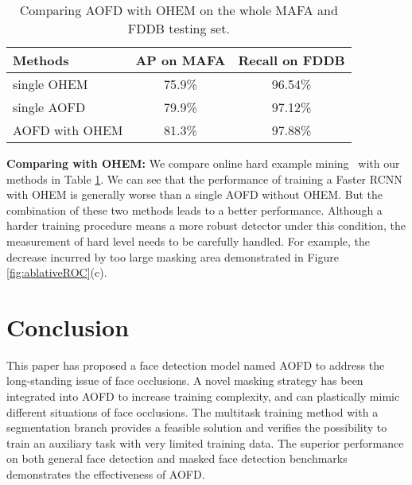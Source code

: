 \documentclass[10pt,twocolumn,letterpaper]{article}
\begin{document}
\begin{table}
	\renewcommand{\arraystretch}{1.5}
       \begin{center}
	\begin{tabular}{|l|c|c|}
		\hline
		Methods & \multicolumn{1}{l|}{AP on MAFA} & Recall on FDDB\\
		\hline\hline
		single OHEM & 75.9\% & 96.54\%\\
		single AOFD & 79.9\% & 97.12\%\\
		AOFD with OHEM & 81.3\% &97.88\%\\
		\hline
	\end{tabular}\end{center}
	\caption{Comparing AOFD with OHEM on the whole MAFA and FDDB testing set.}
	\label{tab:ohem}
\end{table}

\textbf{Comparing with OHEM:} 
We compare online hard example mining~\cite{shrivastava2016training} with our methods in Table \ref{tab:ohem}. We can see that the performance of training a Faster RCNN with OHEM is generally worse than a single AOFD without OHEM. 
But the combination of these two methods leads to a better performance. Although a harder training procedure means a more robust detector under this condition, the measurement of hard level needs to be carefully handled. For example, the decrease incurred by too large masking area demonstrated in Figure \ref{fig:ablativeROC}(c).







\section{Conclusion}
This paper has proposed a face detection model named AOFD to address the long-standing issue of face occlusions. A novel masking strategy has been integrated into AOFD to increase training complexity, and can plastically mimic different situations of face occlusions. The multitask training method with a segmentation branch provides a feasible solution and verifies the possibility to train an auxiliary task with very limited training data. The superior performance on both general face detection and masked face detection benchmarks demonstrates the effectiveness of AOFD.


{\small


}
\end{document}
